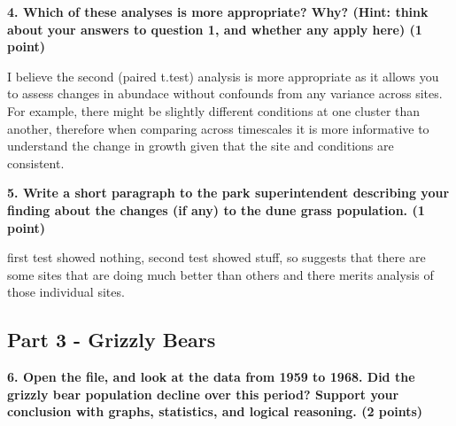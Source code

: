 \documentclass[]{article}
\newenvironment{Shaded}{\begin{snugshade}}{\end{snugshade}}
\newcommand{\KeywordTok}[1]{\textcolor[rgb]{0.13,0.29,0.53}{\textbf{#1}}}
\newcommand{\DataTypeTok}[1]{\textcolor[rgb]{0.13,0.29,0.53}{#1}}
\newcommand{\DecValTok}[1]{\textcolor[rgb]{0.00,0.00,0.81}{#1}}
\newcommand{\StringTok}[1]{\textcolor[rgb]{0.31,0.60,0.02}{#1}}
\newcommand{\CommentTok}[1]{\textcolor[rgb]{0.56,0.35,0.01}{\textit{#1}}}
\newcommand{\OperatorTok}[1]{\textcolor[rgb]{0.81,0.36,0.00}{\textbf{#1}}}
\newcommand{\NormalTok}[1]{#1}
\begin{document}
\textbf{4. Which of these analyses is more appropriate? Why? (Hint:
think about your answers to question 1, and whether any apply here) (1
point)}

I believe the second (paired t.test) analysis is more appropriate as it
allows you to assess changes in abundace without confounds from any
variance across sites. For example, there might be slightly different
conditions at one cluster than another, therefore when comparing across
timescales it is more informative to understand the change in growth
given that the site and conditions are consistent.

\textbf{5. Write a short paragraph to the park superintendent describing
your finding about the changes (if any) to the dune grass population. (1
point)}

first test showed nothing, second test showed stuff, so suggests that
there are some sites that are doing much better than others and there
merits analysis of those individual sites.

\subsection{Part 3 - Grizzly Bears}\label{part-3---grizzly-bears}

\textbf{6. Open the file, and look at the data from 1959 to 1968. Did
the grizzly bear population decline over this period? Support your
conclusion with graphs, statistics, and logical reasoning. (2 points)}

\begin{Shaded}
\end{Shaded}
\end{document}
